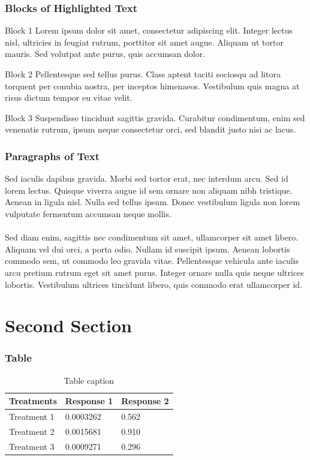 \documentclass{beamer}
\begin{document}
\begin{frame}
\frametitle{Blocks of Highlighted Text}
\begin{block}{Block 1}
Lorem ipsum dolor sit amet, consectetur adipiscing elit. Integer lectus nisl, ultricies in feugiat rutrum, porttitor sit amet augue. Aliquam ut tortor mauris. Sed volutpat ante purus, quis accumsan dolor.
\end{block}

\begin{block}{Block 2}
Pellentesque sed tellus purus. Class aptent taciti sociosqu ad litora torquent per conubia nostra, per inceptos himenaeos. Vestibulum quis magna at risus dictum tempor eu vitae velit.
\end{block}

\begin{block}{Block 3}
Suspendisse tincidunt sagittis gravida. Curabitur condimentum, enim sed venenatis rutrum, ipsum neque consectetur orci, sed blandit justo nisi ac lacus.
\end{block}
\end{frame}


\begin{frame}
\frametitle{Paragraphs of Text}
Sed iaculis dapibus gravida. Morbi sed tortor erat, nec interdum arcu. Sed id lorem lectus. Quisque viverra augue id sem ornare non aliquam nibh tristique. Aenean in ligula nisl. Nulla sed tellus ipsum. Donec vestibulum ligula non lorem vulputate fermentum accumsan neque mollis.\\~\\

Sed diam enim, sagittis nec condimentum sit amet, ullamcorper sit amet libero. Aliquam vel dui orci, a porta odio. Nullam id suscipit ipsum. Aenean lobortis commodo sem, ut commodo leo gravida vitae. Pellentesque vehicula ante iaculis arcu pretium rutrum eget sit amet purus. Integer ornare nulla quis neque ultrices lobortis. Vestibulum ultrices tincidunt libero, quis commodo erat ullamcorper id.
\end{frame}

\section{Second Section}

\begin{frame}
\frametitle{Table}
\begin{table}
\begin{tabular}{l l l}
\toprule
\textbf{Treatments} & \textbf{Response 1} & \textbf{Response 2}\\
\midrule
Treatment 1 & 0.0003262 & 0.562 \\
Treatment 2 & 0.0015681 & 0.910 \\
Treatment 3 & 0.0009271 & 0.296 \\
\bottomrule
\end{tabular}
\caption{Table caption}
\end{table}
\end{frame}
\end{document}
